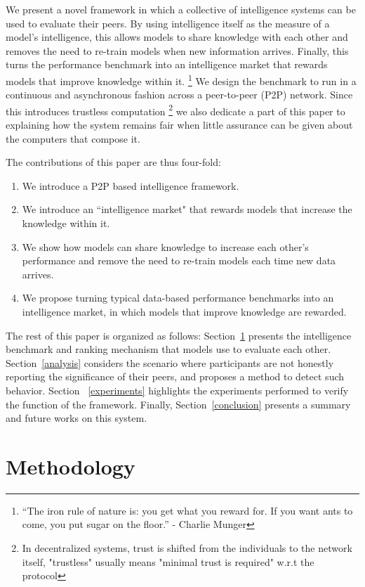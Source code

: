 \documentclass{article}
\begin{document}
We present a novel framework in which a collective of intelligence systems can be used to evaluate their peers. By using intelligence itself as the measure of a model's intelligence, this allows models to share knowledge with each other and removes the need to re-train models when new information arrives. Finally, this turns the performance benchmark into an intelligence market that rewards models that improve knowledge within it. \footnote{“The iron rule of nature is: you get what you reward for. If you want ants to come, you put sugar on the floor.” - Charlie Munger} We design the benchmark to run in a continuous and asynchronous fashion across a peer-to-peer (P2P) network. Since this introduces trustless computation \footnote{ In decentralized systems, trust is shifted from the individuals to the network itself, "trustless" usually means "minimal trust is required" w.r.t the protocol} we also dedicate a part of this paper to explaining how the system remains fair when little assurance can be given about the computers that compose it. 

The contributions of this paper are thus four-fold:
\begin{enumerate}
	\item We introduce a P2P based intelligence framework.
	\item {\color{blue} We introduce an ``intelligence market" that rewards models that increase the knowledge within it.}
	\item We show how models can share knowledge to increase each other's performance and remove the need to re-train models each time new data arrives. 
	\item We propose turning typical data-based performance benchmarks into an intelligence market, in which models that improve knowledge are rewarded. 
\end{enumerate}

The rest of this paper is organized as follows: Section~\ref{methodology} presents the intelligence benchmark and ranking mechanism that models use to evaluate each other. Section~\ref{analysis} considers the scenario where participants are not honestly reporting the significance of their peers, and proposes a method to detect such behavior. Section ~\ref{experiments} highlights the experiments performed to verify the function of the framework. Finally, Section~\ref{conclusion} presents a summary and future works on this system.

\section{Methodology}
\label{methodology}
\end{document}
